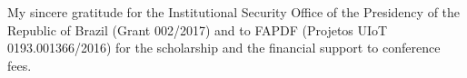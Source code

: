 My sincere gratitude for the Institutional Security Office of the Presidency of the Republic of Brazil (Grant 002/2017) and to FAPDF (Projetos UIoT 0193.001366/2016) for the scholarship and the financial support to conference fees.




